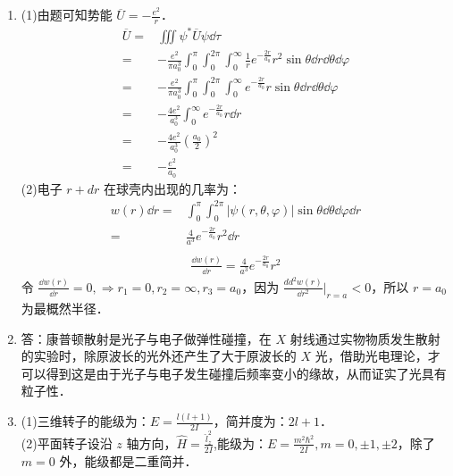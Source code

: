
\begin{issues}
\issueDraft
\end{issues}


\subsection{ }
\begin{enumerate}
\item 
(1)由题可知势能 $\displaystyle \overline{U}=-\frac{e^2}{r}$．
\begin{equation}
\begin{aligned}
\overline{U}=&\iiint \psi^{*} \overline{U} \psi \dd{\tau}\\
=&-\frac{e^2}{\pi a^{3}_{0}}\int^{\pi}_{0}\int^{2\pi}_{0}\int^{\infty}_{0} \frac{1}{r}e^{-\frac{2r}{a_0}}r^{2}\sin{\theta} \dd{r}\dd{\theta}\dd{\varphi}\\
=&-\frac{e^{2}}{\pi a^{3}_{0}}\int^{\pi}_{0}\int^{2\pi}_{0}\int^{\infty}_{0} e^{-\frac{2r}{a_0}}r\sin{\theta} \dd{r}\dd{\theta}\dd{\varphi}\\
=&-\frac{4 e^2}{a^{3}_{0}}\int^{\infty}_{0}e^{-\frac{2r}{a_0}}r\dd{r}\\
=&-\frac{4e^{2}}{a^{3}_{0}}(\frac{a_{0}}{2})^2\\
=&-\frac{e^{2}}{a_{0}}
\end{aligned}
\end{equation}
(2)电子 $r+dr$ 在球壳内出现的几率为：\\
\begin{equation}
\begin{aligned}
w(r)\dd{r}=&\int^{\pi}_{0}\int^{2\pi}_{0} \lvert \psi(r,\theta,\varphi) \rvert \sin{\theta}\dd{\theta}\dd{\varphi}\dd{r}\\
=&\frac{4}{a^{3}}e^{-\frac{2r}{a_0}}r^2 \dd{r}\\
\end{aligned}
\end{equation}
\begin{equation}
\begin{aligned}
\frac{\dd{w(r)}}{\dd{r}}=\frac{4}{a^{3}}e^{-\frac{2r}{a_0}}r^2 
\end{aligned}
\end{equation}
令 $\displaystyle \frac{\dd{w(r)}}{\dd{r}}=0,\Longrightarrow r_1 = 0,r_2 = \infty,r_3 = a_0$，因为 $\displaystyle \frac{dd^{2}{w(r)}}{\dd{r^{2}}}|_{r = a_{}} < 0$，所以 $r = a_0$ 为最概然半径．

\item
答：康普顿散射是光子与电子做弹性碰撞，在 $X$ 射线通过实物物质发生散射的实验时，除原波长的光外还产生了大于原波长的 $X$ 光，借助光电理论，才可以得到这是由于光子与电子发生碰撞后频率变小的缘故，从而证实了光具有粒子性．

\item 
(1)三维转子的能级为：$\displaystyle E = \frac{l(l+1)}{2I}$，简并度为：$2l+1$．\\
(2)平面转子设沿 $z$ 轴方向，$\displaystyle \hat{H} = \frac{\hat{l}^{2}_{z}}{2I}$,能级为：$\displaystyle E = \frac{m^{2} \hbar^{2}}{2I} ,m = 0 , \pm 1 , \pm 2$，除了 $m = 0$ 外，能级都是二重简并．
\end{enumerate}
